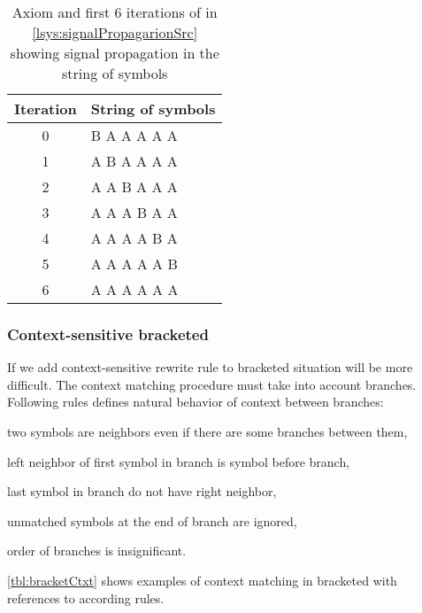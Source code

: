 \begin{table}[h]
	\centering
	\begin{tabular}{c l}
   		\toprule
   		Iteration & String of symbols \\
   		\midrule
		0 & B A A A A A \\
		1 & A B A A A A \\
		2 & A A B A A A \\
		3 & A A A B A A \\
		4 & A A A A B A \\
		5 & A A A A A B \\
		6 & A A A A A A \\
		\bottomrule
	\end{tabular}
	\caption{Axiom and first 6 iterations of \lsystem in \autoref{lsys:signalPropagarionSrc} showing signal propagation in the string of symbols}
	\label{fig:signalPropagarion}
\end{table}


\subsubsection{Context-sensitive bracketed \lsystems}

If we add context-sensitive rewrite rule to bracketed \lsystems situation will be more difficult.
The context matching procedure must take into account branches.
Following rules defines natural behavior of context between branches:
\begin{enumerate*}
	\item \label{enum:ctxRule1} two symbols are neighbors even if there are some branches between them,
	\item \label{enum:ctxRule2} left neighbor of first symbol in branch is symbol before branch,
	\item \label{enum:ctxRule3} last symbol in branch do not have right neighbor,
	\item \label{enum:ctxRule4} unmatched symbols at the end of branch are ignored,
	\item \label{enum:ctxRule5} order of branches is insignificant.
\end{enumerate*}

\autoref{tbl:bracketCtxt} shows examples of context matching in bracketed \lsystems with references to according rules.

